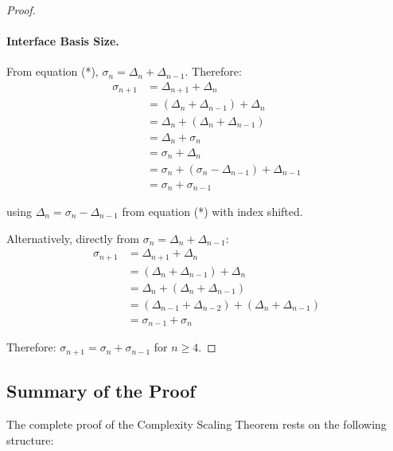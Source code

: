 \documentclass[11pt]{article}
\theoremstyle{definition}
\theoremstyle{remark}
\begin{document}
\begin{proof}
\paragraph{Interface Basis Size.}

From equation (*), $\sigma_n = \Delta_n + \Delta_{n-1}$. Therefore:
\begin{align*}
\sigma_{n+1} &= \Delta_{n+1} + \Delta_n \\
&= (\Delta_n + \Delta_{n-1}) + \Delta_n \\
&= \Delta_n + (\Delta_n + \Delta_{n-1}) \\
&= \Delta_n + \sigma_n \\
&= \sigma_n + \Delta_n \\
&= \sigma_n + (\sigma_n - \Delta_{n-1}) + \Delta_{n-1} \\
&= \sigma_n + \sigma_{n-1}
\end{align*}

using $\Delta_n = \sigma_n - \Delta_{n-1}$ from equation (*) with index shifted.

Alternatively, directly from $\sigma_n = \Delta_n + \Delta_{n-1}$:
\begin{align*}
\sigma_{n+1} &= \Delta_{n+1} + \Delta_n \\
&= (\Delta_n + \Delta_{n-1}) + \Delta_n \\
&= \Delta_n + (\Delta_n + \Delta_{n-1}) \\
&= (\Delta_{n-1} + \Delta_{n-2}) + (\Delta_n + \Delta_{n-1}) \\
&= \sigma_{n-1} + \sigma_n
\end{align*}

Therefore: $\sigma_{n+1} = \sigma_n + \sigma_{n-1}$ for $n \geq 4$.
\end{proof}

\subsection{Summary of the Proof}

The complete proof of the Complexity Scaling Theorem rests on the following structure:
\end{document}
